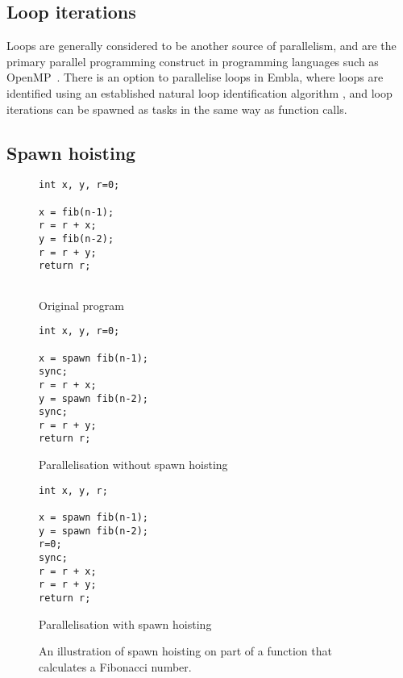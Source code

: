 \subsection{Loop iterations}
Loops are generally considered to be another source of parallelism, and are the primary parallel programming construct in programming languages such as OpenMP~\cite{dagum98openmp}.
There is an option to parallelise loops in Embla, where loops are identified using an established natural loop identification algorithm \cite{aho86compilers, muchnick97advanced}, and loop iterations can be spawned as tasks in the same way as function calls.

\subsection{Spawn hoisting}

\begin{figure}
  \begin{center}
  \scriptsize
  \begin{subfloat}
    \begin{minipage}{0.7in}
      \begin{verbatim}
int x, y, r=0;

x = fib(n-1);
r = r + x;
y = fib(n-2);
r = r + y;
return r;


      \end{verbatim}
    \end{minipage}%
    \label{orig}
    \caption{Original program}
  \end{subfloat}%
  \qquad
  \begin{subfloat}
    \begin{minipage}{1.0in}
      \begin{verbatim}
int x, y, r=0;

x = spawn fib(n-1);
sync;
r = r + x;
y = spawn fib(n-2);
sync;
r = r + y;
return r;
      \end{verbatim}
    \end{minipage}%
    \label{without}
    \caption{Parallelisation without spawn hoisting}
  \end{subfloat}%
  \qquad
  \begin{subfloat}
    \begin{minipage}{1.0in}
      \begin{verbatim}
int x, y, r;

x = spawn fib(n-1);
y = spawn fib(n-2);
r=0;
sync;
r = r + x;
r = r + y;
return r;
      \end{verbatim}
    \end{minipage}%
    \label{with}
    \caption{Parallelisation with spawn hoisting}
  \end{subfloat}%
  \end{center}
  \caption{An illustration of spawn hoisting on part of a function that calculates a Fibonacci number.}
  \label{spawn}
\end{figure}


